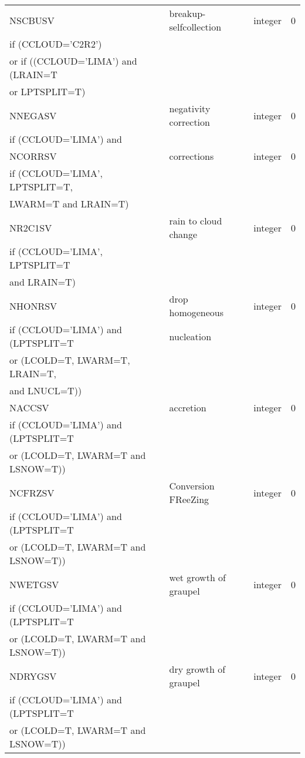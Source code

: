 \begin{longtable} {|p{}|p{}|>{\centering}p{}|p{}<{\centering}|}
NSCBUSV & breakup-selfcollection & integer & 0 \\ \nopagebreak
if (CCLOUD='C2R2') &&& \\ \nopagebreak
or if ((CCLOUD='LIMA') and (LRAIN=T &&& \\ \nopagebreak
or LPTSPLIT=T) &&& \\\hline

NNEGASV & negativity correction& integer & 0 \\ \nopagebreak
if (CCLOUD='LIMA') and &&& \\\hline

NCORRSV & corrections & integer & 0 \\ \nopagebreak
if (CCLOUD='LIMA', LPTSPLIT=T, &&& \\ \nopagebreak
LWARM=T and LRAIN=T) &&& \\\hline

NR2C1SV & rain to cloud change& integer & 0 \\ \nopagebreak
if (CCLOUD='LIMA', LPTSPLIT=T &&& \\ \nopagebreak
and LRAIN=T) &&& \\\hline

NHONRSV & drop homogeneous  & integer & 0 \\ \nopagebreak
if (CCLOUD='LIMA') and (LPTSPLIT=T & nucleation && \\ \nopagebreak
or (LCOLD=T, LWARM=T, LRAIN=T, &&& \\ \nopagebreak
and LNUCL=T))&&& \\\hline

NACCSV & accretion & integer & 0 \\ \nopagebreak
if (CCLOUD='LIMA') and (LPTSPLIT=T &&& \\ \nopagebreak
or (LCOLD=T, LWARM=T and LSNOW=T))&&& \\\hline

NCFRZSV & Conversion FReeZing & integer & 0 \\ \nopagebreak
if (CCLOUD='LIMA') and (LPTSPLIT=T &&& \\ \nopagebreak
or (LCOLD=T, LWARM=T and LSNOW=T))&&& \\\hline

NWETGSV & wet growth of graupel & integer & 0 \\ \nopagebreak
if (CCLOUD='LIMA') and (LPTSPLIT=T &&& \\ \nopagebreak
or (LCOLD=T, LWARM=T and LSNOW=T))&&& \\\hline

NDRYGSV & dry growth of graupel & integer & 0 \\ \nopagebreak
if (CCLOUD='LIMA') and (LPTSPLIT=T &&& \\ \nopagebreak
or (LCOLD=T, LWARM=T and LSNOW=T))&&& \\\hline


\end{longtable}
